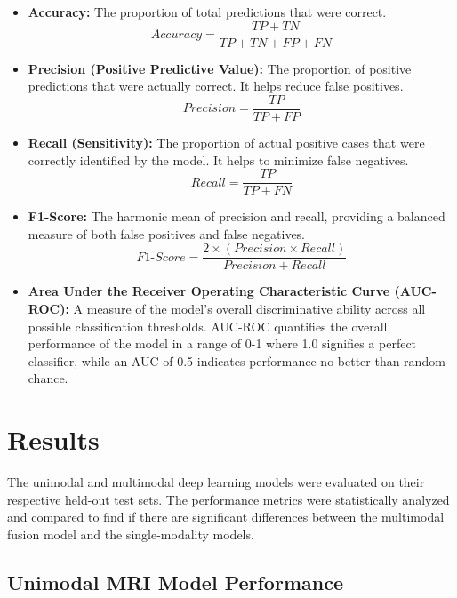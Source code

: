 \documentclass[12pt]{article}
\begin{document}
\begin{itemize}
        \item \textbf{Accuracy: }The proportion of total predictions that were correct.
        \[
        Accuracy = \frac{TP + TN}{TP + TN + FP + FN}
        \]
        \item \textbf{Precision (Positive Predictive Value):}
        The proportion of positive predictions that were actually correct. It helps reduce false positives.
        \[
        Precision = \frac{TP}{TP + FP}
        \]
        \item \textbf{Recall (Sensitivity):}
        The proportion of actual positive cases that were correctly identified by the model. It helps to minimize false negatives.
        \[
        Recall = \frac{TP}{TP + FN}
        \]
        \item \textbf{F1-Score:}
        The harmonic mean of precision and recall, providing a balanced measure of both false positives and false negatives.
        \[
        F1\text{-}Score = \frac{2 \times (Precision \times Recall)}{Precision + Recall}
        \]
        \item \textbf{Area Under the Receiver Operating Characteristic Curve (AUC-ROC): } A measure of the model's overall discriminative ability across all possible classification thresholds. AUC-ROC quantifies the overall performance of the model in a range of 0-1 where 1.0 signifies a perfect classifier, while an AUC of 0.5 indicates performance no better than random chance.
    \end{itemize}

\section{Results}

The unimodal and multimodal deep learning models were evaluated on their respective held-out test sets. The performance metrics were statistically analyzed and compared to find if there are significant differences between the multimodal fusion model and the single-modality models.

\subsection{Unimodal MRI Model Performance}
\end{document}
